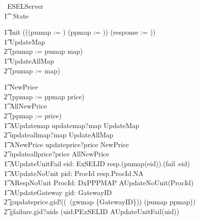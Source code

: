 \begin{circus}
	\circprocess\ ESELServer \circdef \circbegin \\
    	\t1 \circstate\ State 

    	\t1	Init \circdef (((pumap := \emptyset) \circseq (ppmap := \emptyset)) \circseq (response := \emptyset))\\

        \t1 UpdateMap \circdef \\
            \t2 (pumap := pumap \oplus map) \\
        \t1 UpdateAllMap \circdef \\
            \t2 (pumap := map)

        \t1 NewPrice \circdef \\
            \t2 (ppmap := ppmap \oplus price)\\
        \t1 AllNewPrice \circdef \\
            \t2 (ppmap := price)\\

        \t1 AUpdatemap \circdef updatemap?map \then  UpdateMap \\
            \t2 \extchoice updateallmap?map \then  UpdateAllMap \\

        \t1 ANewPrice \circdef updateprice?price \then  NewPrice \\
            \t2 \extchoice updateallprice?price \then  AllNewPrice \\

        \t1 AUpdateUnitFail \circdef  eid: ExSELID \circspot resp.(pumap(eid)).(fail~eid) \then \Skip \\

        \t1 AUpdateNoUnit \circdef  pid: ProcId \circspot resp.ProcId.NA \then \Skip \\

        \t1 ARespNoUnit \circdef \Interleave ProcId: DxPPPMAP \circspot AUpdateNoUnit(ProcId) \\

    \t1 AUpdateGateway \circdef  gid: GatewayID \circspot \\
        \t2 gupdateprice.gid!((\dom~(gwmap \rres \{GatewayID\})) \dres (pumap \comp ppmap)) \then \\
        \t2 gfailure.gid?uids \then (\Interleave uid:PExSELID \circspot AUpdateUnitFail(uid)) \\


\end{circus}
